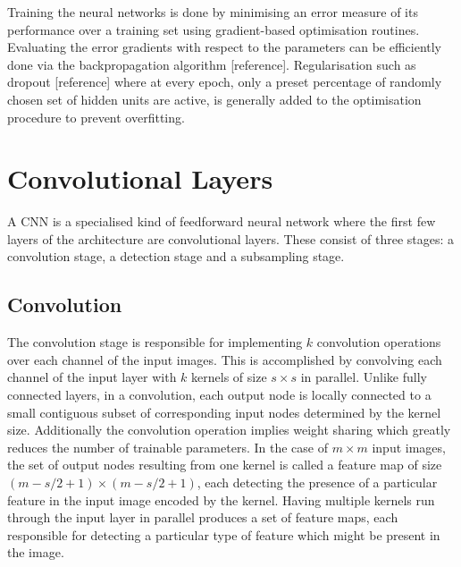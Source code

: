 \noindent Training the neural networks is done by minimising an error measure of its performance over a training set using gradient-based optimisation routines. Evaluating the error gradients with respect to the parameters can be efficiently done via the backpropagation algorithm [reference]. Regularisation such as dropout [reference] where at every epoch, only a preset percentage of randomly chosen set of hidden units are active, is generally added to the optimisation procedure to prevent overfitting.

\section{Convolutional Layers}

\noindent A CNN is a specialised kind of feedforward neural network where the first few layers of the architecture are convolutional layers. These consist of three stages: a convolution stage, a detection stage and a subsampling stage. 

\subsection{Convolution}

\noindent The convolution stage is responsible for implementing $k$ convolution operations over each channel of the input images. This is accomplished by convolving each channel of the input layer with $k$ kernels of size $s \times s$ in parallel. Unlike fully connected layers, in a convolution, each output node is locally connected to a small contiguous subset of corresponding input nodes determined by the kernel size. Additionally the convolution operation implies weight sharing which greatly reduces the number of trainable parameters. In the case of $m \times m$ input images, the set of output nodes resulting from one kernel is called a feature map of size $(m - s/2 + 1) \times (m - s/2 + 1)$, each detecting the presence of a particular feature in the input image encoded by the kernel. Having multiple kernels run through the input layer in parallel produces a set of feature maps, each responsible for detecting a particular type of feature which might be present in the image. \\

